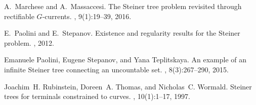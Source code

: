 \documentclass{amsart}
\theoremstyle{definition}
\theoremstyle{remark}
\begin{document}
\begin{thebibliography}{10}
  A.~Marchese and A.~Massaccesi.
  \newblock The {S}teiner tree problem revisited through rectifiable {$G$}-currents.
  , 9(1):19--39, 2016.
  
  E.~Paolini and E.~Stepanov.
  \newblock Existence and regularity results for the {S}teiner problem.
  , 2012.
  
  Emanuele Paolini, Eugene Stepanov, and Yana Teplitskaya.
  \newblock An example of an infinite {S}teiner tree connecting an uncountable set.
  , 8(3):267--290, 2015.
  
  Joachim~H. Rubinstein, Doreen~A. Thomas, and Nicholas~C. Wormald.
  \newblock Steiner trees for terminals constrained to curves.
  , 10(1):1--17, 1997.
  
  \end{thebibliography}  
\end{document}
